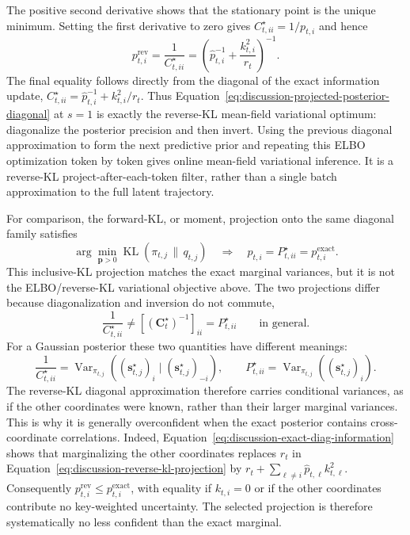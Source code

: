 \documentclass[11pt]{article}
\newcommand{\vct}[1]{\boldsymbol{#1}}
\begin{document}
The positive second derivative shows that the stationary point is the unique minimum. Setting the
first derivative to zero gives $C_{t,ii}^\star=1/p_{t,i}$ and hence
\begin{equation}
  p_{t,i}^{\mathrm{rev}}
  =\frac{1}{C_{t,ii}^\star}
  =\left(\widehat p_{t,i}^{-1}+\frac{k_{t,i}^2}{r_t}\right)^{-1}.
  \label{eq:discussion-reverse-kl-projection}
\end{equation}
The final equality follows directly from the diagonal of the exact information update,
$C_{t,ii}^\star=\widehat p_{t,i}^{-1}+k_{t,i}^2/r_t$.
Thus Equation~\eqref{eq:discussion-projected-posterior-diagonal} at $s=1$ is exactly the
reverse-KL mean-field variational optimum: diagonalize the posterior precision and then invert.
Using the previous diagonal approximation to form the next predictive prior and repeating this
ELBO optimization token by token gives online mean-field variational inference. It is a
reverse-KL project-after-each-token filter, rather than a single batch approximation to the full
latent trajectory.

For comparison, the forward-KL, or moment, projection onto the same diagonal family satisfies
\begin{equation}
  \arg\min_{\vct{p}>0}
  \operatorname{KL}(\pi_{t,j}\,\|\,q_{t,j})
  \quad\Longrightarrow\quad
  p_{t,i}=P_{t,ii}^\star=p^{\mathrm{exact}}_{t,i}.
  \label{eq:discussion-forward-kl-projection}
\end{equation}
This inclusive-KL projection matches the exact marginal variances, but it is not the
ELBO/reverse-KL variational objective above. The two projections differ because diagonalization
and inversion do not commute,
\begin{equation}
  \frac{1}{C_{t,ii}^\star}
  \ne
  \left[(\vct{C}_t^\star)^{-1}\right]_{ii}
  =P_{t,ii}^\star
  \qquad\text{in general}.
  \label{eq:discussion-projection-inversion-noncommute}
\end{equation}
For a Gaussian posterior these two quantities have different meanings:
\begin{equation}
  \frac{1}{C_{t,ii}^\star}
  =\operatorname{Var}_{\pi_{t,j}}
    \!\left((\vct{s}_{t,j}^\star)_i
      \mid(\vct{s}_{t,j}^\star)_{-i}\right),
  \qquad
  P_{t,ii}^\star
  =\operatorname{Var}_{\pi_{t,j}}
    \!\left((\vct{s}_{t,j}^\star)_i\right).
  \label{eq:discussion-conditional-versus-marginal-variance}
\end{equation}
The reverse-KL diagonal approximation therefore carries conditional variances, as if the other
coordinates were known, rather than their larger marginal variances. This is why it is generally
overconfident when the exact posterior contains cross-coordinate correlations.
Indeed, Equation~\eqref{eq:discussion-exact-diag-information} shows that marginalizing the other
coordinates replaces $r_t$ in Equation~\eqref{eq:discussion-reverse-kl-projection} by
$r_t+\sum_{\ell\ne i}\widehat p_{t,\ell}k_{t,\ell}^2$. Consequently
$p^{\mathrm{rev}}_{t,i}\leq p^{\mathrm{exact}}_{t,i}$, with equality if $k_{t,i}=0$ or if the
other coordinates contribute no key-weighted uncertainty. The selected projection is therefore
systematically no less confident than the exact marginal.
\end{document}
